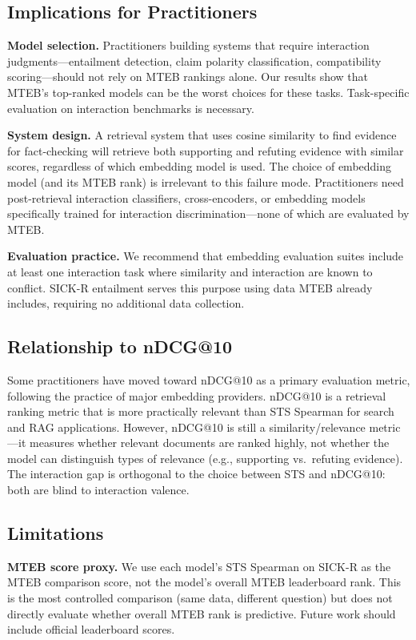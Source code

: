\documentclass{article}
\begin{document}
\subsection{Implications for Practitioners}

\textbf{Model selection.} Practitioners building systems that require interaction judgments---entailment detection, claim polarity classification, compatibility scoring---should not rely on MTEB rankings alone. Our results show that MTEB's top-ranked models can be the worst choices for these tasks. Task-specific evaluation on interaction benchmarks is necessary.

\textbf{System design.} A retrieval system that uses cosine similarity to find evidence for fact-checking will retrieve both supporting and refuting evidence with similar scores, regardless of which embedding model is used. The choice of embedding model (and its MTEB rank) is irrelevant to this failure mode. Practitioners need post-retrieval interaction classifiers, cross-encoders, or embedding models specifically trained for interaction discrimination---none of which are evaluated by MTEB.

\textbf{Evaluation practice.} We recommend that embedding evaluation suites include at least one interaction task where similarity and interaction are known to conflict. SICK-R entailment serves this purpose using data MTEB already includes, requiring no additional data collection.

\subsection{Relationship to nDCG@10}

Some practitioners have moved toward nDCG@10 as a primary evaluation metric, following the practice of major embedding providers. nDCG@10 is a retrieval ranking metric that is more practically relevant than STS Spearman for search and RAG applications. However, nDCG@10 is still a similarity/relevance metric---it measures whether relevant documents are ranked highly, not whether the model can distinguish types of relevance (e.g., supporting vs.\ refuting evidence). The interaction gap is orthogonal to the choice between STS and nDCG@10: both are blind to interaction valence.

\subsection{Limitations}

\textbf{MTEB score proxy.} We use each model's STS Spearman on SICK-R as the MTEB comparison score, not the model's overall MTEB leaderboard rank. This is the most controlled comparison (same data, different question) but does not directly evaluate whether overall MTEB rank is predictive. Future work should include official leaderboard scores.
\end{document}
